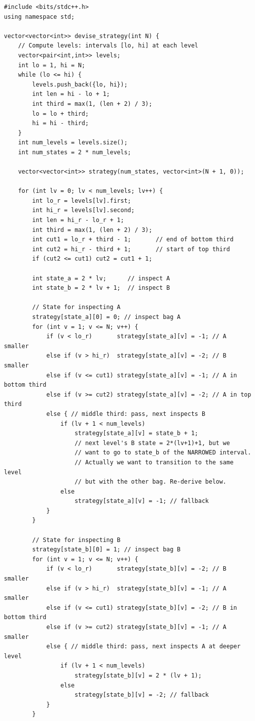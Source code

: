 \documentclass[11pt,a4paper]{article}
\begin{document}
\begin{lstlisting}
#include <bits/stdc++.h>
using namespace std;

vector<vector<int>> devise_strategy(int N) {
    // Compute levels: intervals [lo, hi] at each level
    vector<pair<int,int>> levels;
    int lo = 1, hi = N;
    while (lo <= hi) {
        levels.push_back({lo, hi});
        int len = hi - lo + 1;
        int third = max(1, (len + 2) / 3);
        lo = lo + third;
        hi = hi - third;
    }
    int num_levels = levels.size();
    int num_states = 2 * num_levels;

    vector<vector<int>> strategy(num_states, vector<int>(N + 1, 0));

    for (int lv = 0; lv < num_levels; lv++) {
        int lo_r = levels[lv].first;
        int hi_r = levels[lv].second;
        int len = hi_r - lo_r + 1;
        int third = max(1, (len + 2) / 3);
        int cut1 = lo_r + third - 1;       // end of bottom third
        int cut2 = hi_r - third + 1;       // start of top third
        if (cut2 <= cut1) cut2 = cut1 + 1;

        int state_a = 2 * lv;      // inspect A
        int state_b = 2 * lv + 1;  // inspect B

        // State for inspecting A
        strategy[state_a][0] = 0; // inspect bag A
        for (int v = 1; v <= N; v++) {
            if (v < lo_r)       strategy[state_a][v] = -1; // A smaller
            else if (v > hi_r)  strategy[state_a][v] = -2; // B smaller
            else if (v <= cut1) strategy[state_a][v] = -1; // A in bottom third
            else if (v >= cut2) strategy[state_a][v] = -2; // A in top third
            else { // middle third: pass, next inspects B
                if (lv + 1 < num_levels)
                    strategy[state_a][v] = state_b + 1;
                    // next level's B state = 2*(lv+1)+1, but we
                    // want to go to state_b of the NARROWED interval.
                    // Actually we want to transition to the same level
                    // but with the other bag. Re-derive below.
                else
                    strategy[state_a][v] = -1; // fallback
            }
        }

        // State for inspecting B
        strategy[state_b][0] = 1; // inspect bag B
        for (int v = 1; v <= N; v++) {
            if (v < lo_r)       strategy[state_b][v] = -2; // B smaller
            else if (v > hi_r)  strategy[state_b][v] = -1; // A smaller
            else if (v <= cut1) strategy[state_b][v] = -2; // B in bottom third
            else if (v >= cut2) strategy[state_b][v] = -1; // A smaller
            else { // middle third: pass, next inspects A at deeper level
                if (lv + 1 < num_levels)
                    strategy[state_b][v] = 2 * (lv + 1);
                else
                    strategy[state_b][v] = -2; // fallback
            }
        }


\end{lstlisting}
\end{document}
